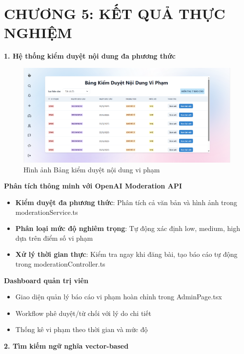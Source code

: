 
\newpage
\section{\textbf{CHƯƠNG 5: KẾT QUẢ THỰC NGHIỆM}}

\textbf{1. Hệ thống kiểm duyệt nội dung đa phương thức}


\begin{figure}[H]
    \centering
    \includegraphics[width=1\textwidth]{image/thucnghiem/report.png}
    \caption{Hình ảnh Bảng kiểm duyệt nội dung vi phạm}
    \label{fig:bao_cao}
\end{figure}



\textbf{Phân tích thông minh với OpenAI Moderation API}
\begin{itemize}
    \item \textbf{Kiểm duyệt đa phương thức}: Phân tích cả văn bản và hình ảnh trong moderationService.ts
    \item \textbf{Phân loại mức độ nghiêm trọng}: Tự động xác định low, medium, high dựa trên điểm số vi phạm
    \item \textbf{Xử lý thời gian thực}: Kiểm tra ngay khi đăng bài, tạo báo cáo tự động trong moderationController.ts
\end{itemize}

\textbf{Dashboard quản trị viên}
\begin{itemize}
    \item Giao diện quản lý báo cáo vi phạm hoàn chỉnh trong AdminPage.tsx
    \item Workflow phê duyệt/từ chối với lý do chi tiết
    \item Thống kê vi phạm theo thời gian và mức độ
\end{itemize}

\newpage

\textbf{2. Tìm kiếm ngữ nghĩa vector-based}

